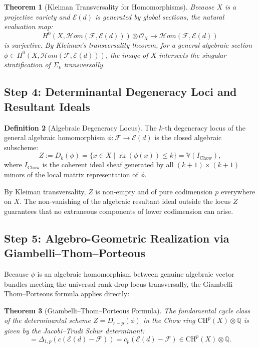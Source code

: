 \documentclass[11pt,reqno]{article}
\newtheorem{theorem}{Theorem}[section]
\theoremstyle{definition}
\newtheorem{definition}[theorem]{Definition}
\DeclareMathOperator{\rk}{rk}
\begin{document}
\begin{theorem}[Kleiman Transversality for Homomorphisms]
Because $X$ is a projective variety and $\mathcal{E}(d)$ is generated by global sections, the natural evaluation map:
\begin{equation}
H^0(X, \mathcal{H}om(\mathcal{F}, \mathcal{E}(d))) \otimes \mathcal{O}_X \longrightarrow \mathcal{H}om(\mathcal{F}, \mathcal{E}(d))
\end{equation}
is surjective. By Kleiman's transversality theorem, for a general algebraic section $\phi \in H^0(X, \mathcal{H}om(\mathcal{F}, \mathcal{E}(d)))$, the image of $X$ intersects the singular stratification of $\Sigma_k$ transversally.
\end{theorem}

\subsection{Step 4: Determinantal Degeneracy Loci and Resultant Ideals}
\begin{definition}[Algebraic Degeneracy Locus]
The $k$-th degeneracy locus of the general algebraic homomorphism $\phi : \mathcal{F} \to \mathcal{E}(d)$ is the closed algebraic subscheme:
\begin{equation}
Z := D_k(\phi) = \{x \in X \mid \rk(\phi(x)) \le k\} = \mathbb{V}(I_{\mathrm{Chow}}),
\end{equation}
where $I_{\mathrm{Chow}}$ is the coherent ideal sheaf generated by all $(k+1) \times (k+1)$ minors of the local matrix representation of $\phi$.
\end{definition}

By Kleiman transversality, $Z$ is non-empty and of pure codimension $p$ everywhere on $X$. The non-vanishing of the algebraic resultant ideal outside the locus $Z$ guarantees that no extraneous components of lower codimension can arise.

\subsection{Step 5: Algebro-Geometric Realization via Giambelli--Thom--Porteous}
Because $\phi$ is an algebraic homomorphism between genuine algebraic vector bundles meeting the universal rank-drop locus transversally, the Giambelli--Thom--Porteous formula applies directly:

\begin{theorem}[Giambelli--Thom--Porteous Formula]
The fundamental cycle class of the determinantal scheme $Z = D_{r-p}(\phi)$ in the Chow ring $\mathrm{CH}^p(X) \otimes \mathbb{Q}$ is given by the Jacobi--Trudi Schur determinant:
\begin{equation}
[Z] = \Delta_{1,p}(c(\mathcal{E}(d) - \mathcal{F})) = c_p(\mathcal{E}(d) - \mathcal{F}) \in \mathrm{CH}^p(X) \otimes \mathbb{Q}.
\end{equation}
\end{theorem}
\end{document}
